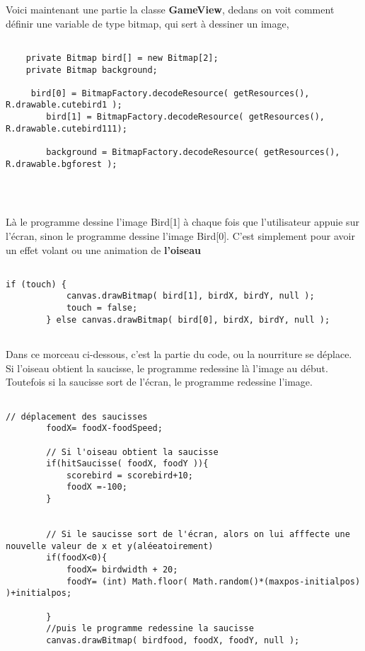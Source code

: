 \documentclass{article}
\begin{document}
Voici maintenant une partie la classe \textbf{GameView}, dedans on voit comment définir une variable de type bitmap, qui sert à dessiner un image,

\begin{verbatim}
    
    private Bitmap bird[] = new Bitmap[2];
    private Bitmap background;
    
     bird[0] = BitmapFactory.decodeResource( getResources(), R.drawable.cutebird1 );
        bird[1] = BitmapFactory.decodeResource( getResources(), R.drawable.cutebird111);

        background = BitmapFactory.decodeResource( getResources(), R.drawable.bgforest );


    
\end{verbatim}

\medskip

Là le programme dessine l'image Bird[1] à chaque fois que l'utilisateur appuie sur l'écran, sinon le programme dessine l'image Bird[0]. C'est simplement pour avoir un effet volant ou une animation de \textbf{l'oiseau}

\begin{verbatim}

if (touch) {
            canvas.drawBitmap( bird[1], birdX, birdY, null );
            touch = false;
        } else canvas.drawBitmap( bird[0], birdX, birdY, null );
    
\end{verbatim}

\medskip
Dans ce morceau ci-dessous, c'est la partie du code, ou la nourriture se déplace. Si l'oiseau obtient la saucisse, le programme redessine là l'image au début. Toutefois si la saucisse sort de l'écran, le programme redessine l'image.

\begin{verbatim}

// déplacement des saucisses
        foodX= foodX-foodSpeed;

        // Si l'oiseau obtient la saucisse
        if(hitSaucisse( foodX, foodY )){
            scorebird = scorebird+10;
            foodX =-100;
        }
        
        
        // Si le saucisse sort de l'écran, alors on lui afffecte une nouvelle valeur de x et y(aléeatoirement)
        if(foodX<0){
            foodX= birdwidth + 20;
            foodY= (int) Math.floor( Math.random()*(maxpos-initialpos) )+initialpos;

        }
        //puis le programme redessine la saucisse
        canvas.drawBitmap( birdfood, foodX, foodY, null );
    
\end{verbatim}
\end{document}
